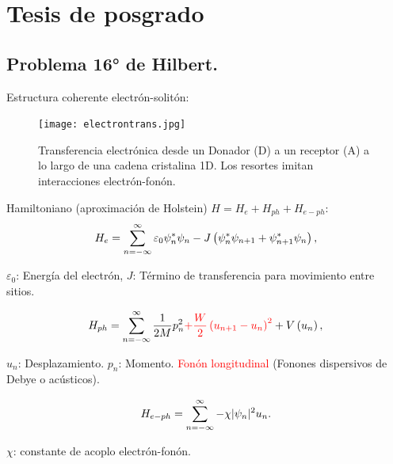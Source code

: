 \documentclass[10pt]{beamer}
\newtheorem{observacion}{Observaci\'on}[section]
\newtheorem{final remarks}{final remarks}[section]
\newtheorem{future work collaboration}{future work collaboration}[section]
\begin{document}
\section{Tesis de posgrado}
\subsection{Problema 16° de Hilbert.}
\begin{frame}



Estructura coherente electr\'on-solit\'on:
\begin{figure}
\texttt{[image: electrontrans.jpg]}
\caption{Transferencia electr\'onica desde un Donador (D)  a un receptor (A) a lo largo de una cadena cristalina 1D. Los resortes imitan interacciones electr\'on-fon\'on.}
\end{figure}

\end{frame}


\begin{frame}
Hamiltoniano (aproximaci\'on de Holstein) $H=H_e+H_{ph}+H_{e-ph}$:
\begin{equation}
H_{e}=\sum_{n=-\infty}^{\infty}\varepsilon_{0}\psi_{n}^{*}\psi_{n}-J\left(\psi_{n}^{*}\psi_{n+1}+\psi_{n+1}^{*}\psi_{n}\right), \notag
\end{equation}

$\varepsilon_{0}$: Energ\'ia del electr\'on, $J$: T\'ermino de transferencia para movimiento entre sitios.

\begin{equation}
H_{ph}=\sum_{n=-\infty}^{\infty}\frac{1}{2M} p_{n}^{2}\textcolor{red}{+\frac{W}{2}\left(u_{n+1}-u_{n}\right)^{2}}+V\left(u_n\right), \notag
\end{equation}

$u_n$: Desplazamiento. $p_n$: Momento. \textcolor{red}{Fon\'on longitudinal} (Fonones dispersivos de Debye o ac\'usticos). 

\begin{equation}
H_{e-ph}=\sum_{n=-\infty}^{\infty}-\chi |\psi_{n}|^2u_n.  \notag
\end{equation}

$\chi$: constante de acoplo electr\'on-fon\'on.



\end{frame}
\end{document}

